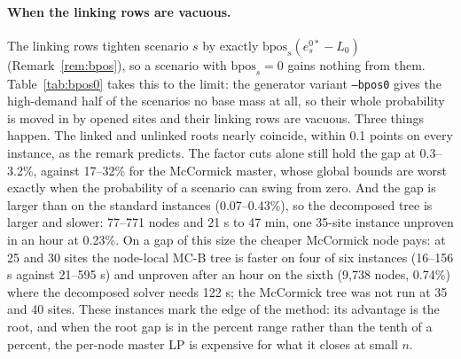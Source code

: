 \documentclass[11pt]{article}
\newcommand{\bpos}{\mathrm{bpos}}
\begin{document}
\paragraph{When the linking rows are vacuous.} The linking rows tighten scenario $s$ by exactly $\bpos_s(e^{0*}_s - L_0)$
(Remark~\ref{rem:bpos}), so a scenario with $\bpos_s = 0$ gains nothing from them. Table~\ref{tab:bpos0} takes this to the
limit: the generator variant \texttt{--bpos0} gives the high-demand half of the scenarios no base mass at all, so their
whole probability is moved in by opened sites and their linking rows are vacuous. Three things happen. The linked and
unlinked roots nearly coincide, within 0.1 points on every instance, as the remark predicts. The factor cuts alone still
hold the gap at 0.3--3.2\%, against 17--32\% for the McCormick master, whose global bounds are worst exactly when the
probability of a scenario can swing from zero. And the gap is larger than on the standard instances (0.07--0.43\%), so
the decomposed tree is larger and slower: 77--771 nodes and 21 s to 47 min, one 35-site instance unproven in an hour at
0.23\%. On a gap of this size the cheaper McCormick node pays: at 25 and 30 sites the node-local \textsc{MC-B} tree is
faster on four of six instances (16--156 s against 21--595 s) and unproven after an hour on the sixth (9,738 nodes,
0.74\%) where the decomposed solver needs 122 s; the McCormick tree was not run at 35 and 40 sites. These instances
mark the edge of the method: its advantage is the root, and when the root gap is in the percent range rather than the
tenth of a percent, the per-node master LP is expensive for what it closes at small $n$.
\end{document}
